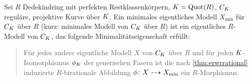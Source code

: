 \documentclass[german, bibliography=totoc]{scrreprt}
\begin{document}
\begin{Definition}
  Sei $R$ Dedekindring mit perfekten Restklassenkörpern,
  $K=\operatorname{Quot}(R)$,
  $C_{K}$ reguläre, projektive Kurve über $K$.
  Ein minimales eigentliches Modell $X_{\text{min}}$ für $C_{K}$ über
  $R$ (kurz: minimales Modell von $C_{K}$ über $R$) ist ein
  eigentliches $R$-Modell von $C_{K}$, das folgende
  Minimalitätseigenschaft erfüllt:
  \begin{quote}
    Für jedes andere eigentliche Modell $X$ von
    $C_{K}$ über $R$ und für jeden $K$-Isomorphismus $\phi_{K}$ der
    generischen Fasern ist die nach \ref{thm:erwrrational}
    induzierte $R$-birationale Abbildung $\phi\colon X\dashrightarrow
    X_{\text{min}}$ ein $R$-Morphismus.
  \end{quote}
\end{Definition}
\end{document}
